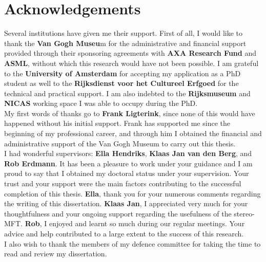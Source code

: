 
\chapter*{Acknowledgements}

Several institutions have given me their support. First of all, I would like to thank the \textbf{Van Gogh Museu}m for the administrative and financial support provided through their sponsoring agreements with \textbf{AXA Research Fund} and \textbf{ASML}, without which this research would have not been possible. I am grateful to the \textbf{University of Amsterdam} for accepting my application as a PhD student as well to the \textbf{Rijksdienst voor het Cultureel Erfgoed} for the technical and practical support. I am also indebted to the \textbf{Rijksmuseum} and \textbf{NICAS} working space I was able to occupy during the PhD.\\ 


My first words of thanks go to \textbf{Frank Ligterink}, since none of this would have happened without his initial support. Frank has supported me since the beginning of my professional career, and through him I obtained the financial and administrative support of the Van Gogh Museum to carry out this thesis. \\

I had wonderful supervisors: \textbf{Ella Hendriks}, \textbf{Klaas Jan van den Berg}, and \textbf{Rob Erdmann}. It has been a pleasure to work under your guidance and I am proud to say that I obtained my doctoral status under your supervision. Your trust and your support were the main factors contributing to the successful completion of this thesis. \textbf{Ella}, thank you for your numerous comments regarding the writing of this dissertation. \textbf{Klaas Jan}, I appreciated very much for your thoughtfulness and your ongoing support regarding the usefulness of the stereo-MFT. \textbf{Rob}, I enjoyed and learnt so much during our regular meetings. Your advice and help contributed to a large extent to the success of this research. \\

I also wish to thank the members of my defence committee for taking the time to read and review my dissertation. \\
 
